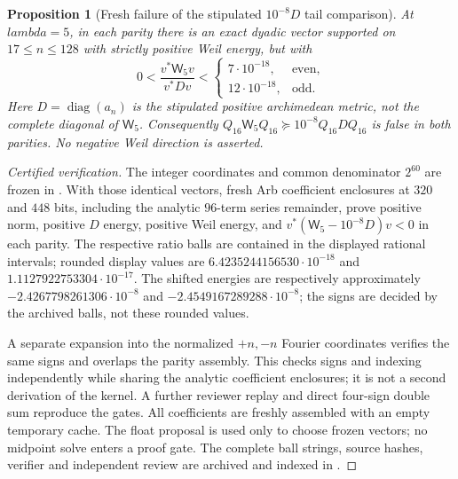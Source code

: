\documentclass[11pt]{article}
\def\lambda{lambda}%
\newtheorem{proposition}[theorem]{Proposition}
\theoremstyle{remark}
\begin{document}
\begin{proposition}[Fresh failure of the stipulated $10^{-8}D$ tail comparison]
\label{prop:v152-tail-comparison}
At $\lambda=5$, in each parity there is an exact dyadic vector supported
on $17\le n\le128$ with strictly positive Weil energy, but with
\[
 0<\frac{v^*\mathsf W_5v}{v^*Dv}
 <\begin{cases}7\cdot10^{-18},&\text{even},\\
               12\cdot10^{-18},&\text{odd}.
   \end{cases}
\]
Here $D=\operatorname{diag}(a_n)$ is the stipulated positive
archimedean metric, not the complete diagonal of $\mathsf W_5$.
Consequently $Q_{16}\mathsf W_5Q_{16}\succeq10^{-8}Q_{16}DQ_{16}$
is false in both parities. No negative Weil direction is asserted.
\end{proposition}
\begin{proof}[Certified verification]
The integer coordinates and common denominator $2^{60}$ are frozen in
. With those identical
vectors, fresh Arb coefficient enclosures at $320$ and $448$ bits,
including the analytic $96$-term series remainder, prove positive norm,
positive $D$ energy, positive Weil energy, and
$v^*(\mathsf W_5-10^{-8}D)v<0$ in each parity.
The respective ratio balls are contained in the displayed rational
intervals; rounded display values are
$6.4235244156530\cdot10^{-18}$ and
$1.1127922753304\cdot10^{-17}$.
The shifted energies are respectively approximately
$-2.4267798261306\cdot10^{-8}$ and
$-2.4549167289288\cdot10^{-8}$; the signs are decided by the
archived balls, not these rounded values.

A separate expansion into the normalized $+n,-n$ Fourier coordinates
verifies the same signs and overlaps the parity assembly. This checks
signs and indexing independently while sharing the analytic coefficient
enclosures; it is not a second derivation of the kernel. A further
reviewer replay and direct four-sign double sum reproduce the gates.
All coefficients are freshly assembled with an empty temporary cache.
The float proposal is used only to choose frozen vectors; no midpoint
solve enters a proof gate. The complete ball strings, source hashes,
verifier and independent review are archived and indexed in
.
\end{proof}
\end{document}
